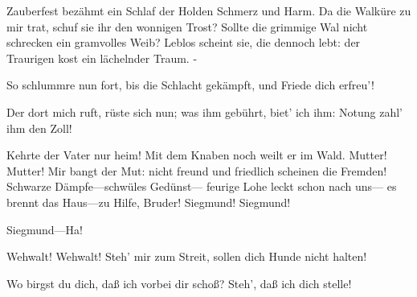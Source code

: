 \begin{drama}
Zauberfest bezähmt ein Schlaf
der Holden Schmerz und Harm.
Da die Walküre zu mir trat,
schuf sie ihr den wonnigen Trost?
Sollte die grimmige Wal
nicht schrecken ein gramvolles Weib?
Leblos scheint sie, die dennoch lebt:
der Traurigen kost ein lächelnder Traum. -



So schlummre nun fort,
bis die Schlacht gekämpft,
und Friede dich erfreu'!
 



Der dort mich ruft, rüste sich nun;
was ihm gebührt, biet' ich ihm:
Notung zahl' ihm den Zoll!
 




\Sieglindespeaks


Kehrte der Vater nur heim!
Mit dem Knaben noch weilt er im Wald.
Mutter! Mutter! Mir bangt der Mut:
nicht freund und friedlich scheinen die Fremden!
Schwarze Dämpfe---schwüles Gedünst---
feurige Lohe leckt schon nach uns---
es brennt das Haus---zu Hilfe, Bruder!
Siegmund! Siegmund!
 



Siegmund---Ha!
 






Wehwalt! Wehwalt!
Steh' mir zum Streit, sollen dich Hunde nicht halten!
 



Wo birgst du dich, daß ich vorbei dir schoß?
Steh', daß ich dich stelle!
 

\Sieglindespeaks


\end{drama}

